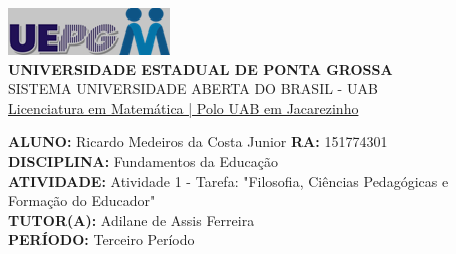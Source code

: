 \documentclass[a4paper, 12pt]{article}
\begin{document}
\begin{flushleft}\includegraphics{logo}\\
\textbf{UNIVERSIDADE ESTADUAL DE PONTA GROSSA} \\
SISTEMA UNIVERSIDADE ABERTA DO BRASIL - UAB \\
\underline{Licenciatura em Matemática | Polo UAB em Jacarezinho}\end{flushleft} 
\textbf{ALUNO:} Ricardo Medeiros da Costa Junior   \textbf{RA:} 151774301 \\
\textbf{DISCIPLINA:} Fundamentos da Educação \\
\textbf{ATIVIDADE:} Atividade 1 - Tarefa: "Filosofia, Ciências Pedagógicas e Formação do Educador" \\
\textbf{TUTOR(A):} Adilane de Assis Ferreira\\
\textbf{PERÍODO:} Terceiro Período \\ \\
\end{document}
